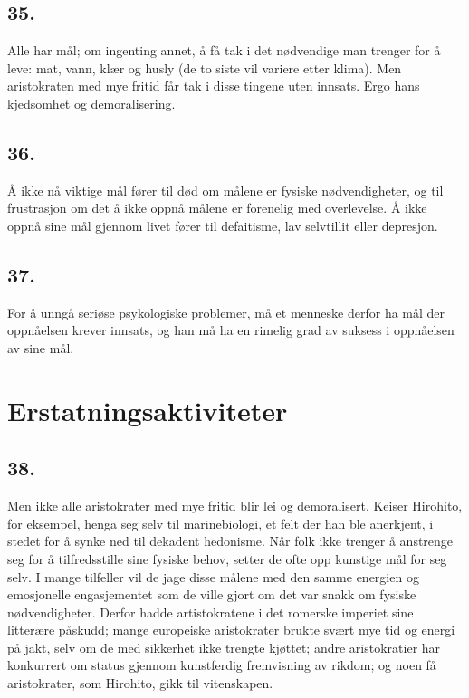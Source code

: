 \documentclass[oneside]{book}
\begin{document}
\section*{35.}
Alle har mål; om ingenting annet, å få tak i det nødvendige man trenger for å
leve: mat, vann, klær og husly (de to siste vil variere etter klima). Men
aristokraten med mye fritid får tak i disse tingene uten innsats. Ergo hans
kjedsomhet og demoralisering.

\section*{36.}
Å ikke nå viktige mål fører til død om målene er fysiske nødvendigheter, og til
frustrasjon om det å ikke oppnå målene er forenelig med overlevelse. Å ikke
oppnå sine mål gjennom livet fører til defaitisme, lav selvtillit eller
depresjon.

\section*{37.}
For å unngå seriøse psykologiske problemer, må et menneske derfor ha mål der
oppnåelsen krever innsats, og han må ha en rimelig grad av suksess i oppnåelsen
av sine mål.

\chapter{Erstatningsaktiviteter}
\section*{38.}
Men ikke alle aristokrater med mye fritid blir lei og demoralisert. Keiser
Hirohito, for eksempel, henga seg selv til marinebiologi, et felt der han ble
anerkjent, i stedet for å synke ned til dekadent hedonisme. Når folk ikke
trenger å anstrenge seg for å tilfredsstille sine fysiske behov, setter de ofte
opp kunstige mål for seg selv. I mange tilfeller vil de jage disse målene med
den samme energien og emosjonelle engasjementet som de ville gjort om det var
snakk om fysiske nødvendigheter. Derfor hadde artistokratene i det romerske
imperiet sine litterære påskudd; mange europeiske aristokrater brukte svært mye
tid og energi på jakt, selv om de med sikkerhet ikke trengte kjøttet; andre
aristokratier har konkurrert om status gjennom kunstferdig fremvisning av
rikdom; og noen få aristokrater, som Hirohito, gikk til vitenskapen.
\end{document}
